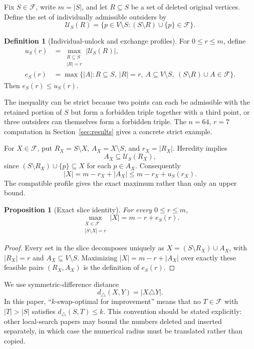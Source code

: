 \documentclass[11pt]{article}
\newtheorem{proposition}[theorem]{Proposition}
\theoremstyle{definition}
\newtheorem{definition}[theorem]{Definition}
\theoremstyle{remark}
\newcommand{\F}{\mathcal{F}}
\newcommand{\calU}{\mathcal{U}}
\newcommand{\dist}{d_{\triangle}}
\begin{document}
Fix $S\in\F$, write $m=|S|$, and let $R\subseteq S$ be a set of deleted
original vertices.  Define the set of individually admissible outsiders by
\[
  \calU_S(R)=\bigl\{p\in V\setminus S:
       (S\setminus R)\cup\{p\}\in\F\bigr\}.
\]

\begin{definition}[Individual-unlock and exchange profiles]
For $0\le r\le m$, define
\begin{align*}
  u_S(r)&=\max_{\substack{R\subseteq S\\|R|=r}}|\calU_S(R)|,\\
  e_S(r)&=\max\bigl\{|A|: R\subseteq S,\ |R|=r,\ A\subseteq V\setminus S,
                 \ (S\setminus R)\cup A\in\F\bigr\}.
\end{align*}
Then $e_S(r)\le u_S(r)$.
\end{definition}

The inequality can be strict because two points can each be admissible with
the retained portion of $S$ but form a forbidden triple together with a third
point, or three outsiders can themselves form a forbidden triple.  The
$n=64$, $r=7$ computation in Section~\ref{sec:results} gives a concrete strict
example.

For $X\in\F$, put $R_X=S\setminus X$, $A_X=X\setminus S$, and
$r_X=|R_X|$.  Heredity implies
\[
  A_X\subseteq\calU_S(R_X),
\]
since $(S\setminus R_X)\cup\{p\}\subseteq X$ for each $p\in A_X$.
Consequently
\begin{equation}
  |X|=m-r_X+|A_X|\le m-r_X+u_S(r_X).
  \label{eq:unlock-slice}
\end{equation}
The compatible profile gives the exact maximum rather than only an upper
bound.

\begin{proposition}[Exact slice identity]
\label{prop:slice}
For every $0\le r\le m$,
\[
 \max_{\substack{X\in\F\\|S\setminus X|=r}}|X|
 =m-r+e_S(r).
\]
\end{proposition}

\begin{proof}
Every set in the slice decomposes uniquely as
$X=(S\setminus R_X)\cup A_X$, with $|R_X|=r$ and
$A_X\subseteq V\setminus S$.  Maximizing $|X|=m-r+|A_X|$ over exactly these
feasible pairs $(R_X,A_X)$ is the definition of $e_S(r)$.
\end{proof}

We use symmetric-difference distance
\[
  \dist(X,Y)=|X\triangle Y|.
\]
In this paper, ``$k$-swap-optimal for improvement'' means that no
$T\in\F$ with $|T|>|S|$ satisfies $\dist(S,T)\le k$.  This convention should
be stated explicitly: other local-search papers may bound the numbers deleted
and inserted separately, in which case the numerical radius must be
translated rather than copied.
\end{document}
